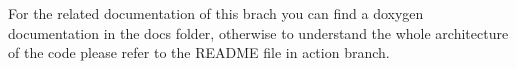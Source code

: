 For the related documentation of this brach you can find a doxygen documentation in the docs folder, otherwise to understand the whole architecture of the code please refer to the R\+E\+A\+D\+ME file in \textquotesingle{}action\textquotesingle{} branch. 
